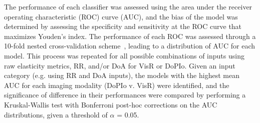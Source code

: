 The performance of each classifier was assessed using the area under the receiver operating characteristic (ROC) curve (AUC), and the bias of the model was determined by assessing the specificity and sensitivity at the ROC curve that maximizes Youden's index. The performance of each ROC was assessed through a 10-fold nested cross-validation scheme~\cite{varma_Bias_2006}, leading to a distribution of AUC for each model. This process was repeated for all possible combinations of inputs using raw elasticity metrics, RR, and/or DoA for VisR or DoPIo. Given an input category (e.g. using RR and DoA inputs), the models with the highest mean AUC for each imaging modality (DoPIo v. VisR) were identified, and the significance of difference in their performances were compared by performing a Kruskal-Wallis test with Bonferroni post-hoc corrections on the AUC distributions, given a threshold of $\alpha$ = 0.05.
